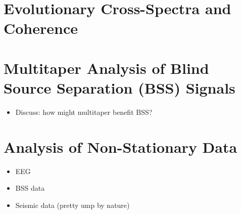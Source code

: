 \documentclass{article}
\begin{document}
\section{Evolutionary Cross-Spectra and Coherence}

\section{Multitaper Analysis of Blind Source Separation (BSS) Signals}
\begin{itemize}
    \item Discuss: how might multitaper benefit BSS? 
\end{itemize}

\section{Analysis of Non-Stationary Data}
    \begin{itemize}
        \item EEG
        \item BSS data
        \item Seismic data (pretty ump by nature)
    \end{itemize}
\end{document}
